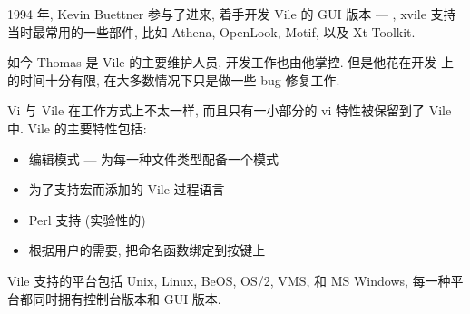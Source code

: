 1994 年, Kevin Buettner 参与了进来, 着手开发 Vile 的 GUI 版本 ---
, xvile 支持当时最常用的一些部件, 比如 Athena, OpenLook,
Motif, 以及 Xt Toolkit.

如今 Thomas 是 Vile 的主要维护人员, 开发工作也由他掌控. 但是他花在开发
上的时间十分有限, 在大多数情况下只是做一些 bug 修复工作.

Vi 与 Vile 在工作方式上不太一样, 而且只有一小部分的 vi 特性被保留到了
Vile 中. Vile 的主要特性包括:
\begin{itemize}
    \item 编辑模式 --- 为每一种文件类型配备一个模式
    \item 为了支持宏而添加的 Vile  过程语言
    \item Perl 支持 (实验性的)
    \item 根据用户的需要, 把命名函数绑定到按键上
\end{itemize}

Vile 支持的平台包括 Unix, Linux, BeOS, OS/2, VMS, 和 MS Windows,
每一种平台都同时拥有控制台版本和 GUI 版本.
